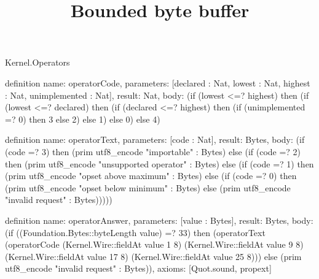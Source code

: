 \begin{lexlean}{Kernel.Operators}
\title{Bounded byte buffer}
\begin{semanticmodule}
definition{
  name: operatorCode,
  parameters: [declared : Nat, lowest : Nat, highest : Nat, unimplemented : Nat],
  result: Nat,
  body: (if (lowest <=? highest) then (if (lowest <=? declared) then (if (declared <=? highest) then (if (unimplemented =? 0) then 3 else 2) else 1) else 0) else 4)
}

definition{
  name: operatorText,
  parameters: [code : Nat],
  result: Bytes,
  body: (if (code =? 3) then (prim utf8_encode "importable" : Bytes) else (if (code =? 2) then (prim utf8_encode "unsupported operator" : Bytes) else (if (code =? 1) then (prim utf8_encode "opset above maximum" : Bytes) else (if (code =? 0) then (prim utf8_encode "opset below minimum" : Bytes) else (prim utf8_encode "invalid request" : Bytes)))))
}

definition{
  name: operatorAnswer,
  parameters: [value : Bytes],
  result: Bytes,
  body: (if ((Foundation.Bytes::byteLength value) =? 33) then (operatorText (operatorCode (Kernel.Wire::fieldAt value 1 8) (Kernel.Wire::fieldAt value 9 8) (Kernel.Wire::fieldAt value 17 8) (Kernel.Wire::fieldAt value 25 8))) else (prim utf8_encode "invalid request" : Bytes)),
  axioms: [Quot.sound, propext]
}
\end{semanticmodule}
\end{lexlean}
